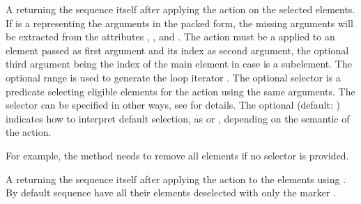 \documentclass[letterpaper,10pt,english]{sphinxmanual}
\begin{document}
\begin{description}
\sphinxAtStartPar
A   returning the sequence itself after applying the action  on the selected elements. If 
is a  representing the arguments in the packed form, the missing arguments will be extracted from the attributes ,
,  and . The action  must be a   applied to an element passed as
first argument and its index as second argument, the optional third argument being the index of the main element in case  is a sub\sphinxhyphen{}element.
The optional range is used to generate the loop iterator . The optional selector  is a  
predicate selecting eligible elements for the action using the same arguments. The selector  can be specified in other ways,
see {\hyperref[\detokenize{sequences:element-selections}]{}} for details. The optional   (default: ) indicates how to interpret default selection, as
 or , depending on the semantic of the action. %
\begin{footnote}[2]\sphinxAtStartFootnote
For example, the  method needs  to  remove all elements if no selector is provided.
%
\end{footnote}

\sphinxAtStartPar
A  \sphinxcode{\sphinxupquote{({[}flg{]}, {[}rng{]}, {[}sel{]}, {[}not{]})}} returning the sequence itself after applying the action  to the elements using
. By default sequence have all their elements deselected with only the  marker .


\end{description}
\end{document}
